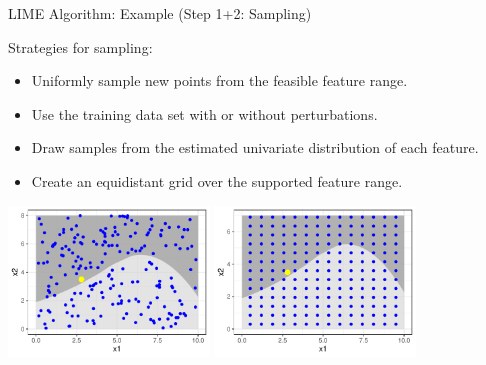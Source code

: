 \documentclass[11pt,compress,t,notes=noshow, aspectratio=169, xcolor=table]{beamer}
\begin{document}
\begin{frame}[c]{LIME Algorithm: Example (Step 1+2: Sampling) }
		
		Strategies for sampling: 
		\begin{itemize} 
			\item Uniformly sample new points from the feasible feature range. 
			\item Use the training data set with or without perturbations.
			\item Draw samples from the estimated univariate distribution of each feature.
			\item Create an equidistant grid over the supported feature range.  
		\end{itemize}
		\begin{center}
			\includegraphics[width=0.4\textwidth]{figure/lime3} \hspace{0.1cm}
			\includegraphics[width=0.4\textwidth]{figure/lime3a}
		\end{center}

\end{frame}
		
\end{document}
